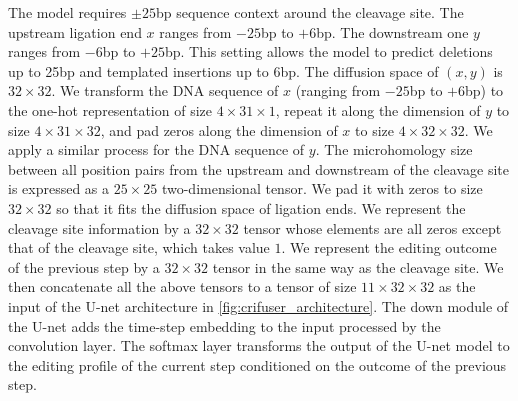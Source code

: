 \documentclass{article}
\begin{document}
The model requires $\pm 25$bp sequence context around the cleavage site. The upstream ligation end $x$ ranges from $-25$bp to $+6$bp. The downstream one $y$ ranges from $-6$bp to $+25$bp. This setting allows the model to predict deletions up to 25bp and templated insertions up to 6bp. The diffusion space of $(x,y)$ is $32\times 32$. We transform the DNA sequence of $x$ (ranging from $-25$bp to $+6$bp) to the one-hot representation of size $4\times 31\times 1$, repeat it along the dimension of $y$ to size $4\times 31\times 32$, and pad zeros along the dimension of $x$ to size $4\times 32\times 32$. We apply a similar process for the DNA sequence of $y$. The microhomology size between all position pairs from the upstream and downstream of the cleavage site is expressed as a $25\times 25$ two-dimensional tensor. We pad it with zeros to size $32\times 32$ so that it fits the diffusion space of ligation ends. We represent the cleavage site information by a $32\times 32$ tensor whose elements are all zeros except that of the cleavage site, which takes value $1$. We represent the editing outcome of the previous step by a $32\times 32$ tensor in the same way as the cleavage site. We then concatenate all the above tensors to a tensor of size $11\times 32\times 32$ as the input of the U-net architecture in \cref{fig:crifuser_architecture}. The down module of the U-net adds the time-step embedding to the input processed by the convolution layer. The softmax layer transforms the output of the U-net model to the editing profile of the current step conditioned on the outcome of the previous step.
\end{document}
